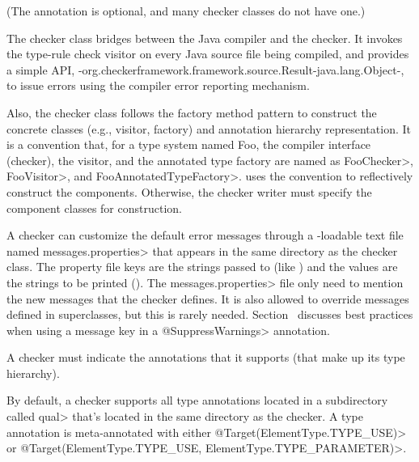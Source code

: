 (The  annotation is
optional, and many checker classes do not have one.)

The checker class bridges between the Java compiler and the checker.  It
invokes the type-rule check visitor on every Java source file being
compiled, and provides a simple API,
{-org.checkerframework.framework.source.Result-java.lang.Object-}, to issue
errors using the compiler error reporting mechanism.

Also, the checker class follows the factory method pattern to
construct the concrete classes (e.g., visitor, factory) and annotation
hierarchy representation.  It is a convention that, for
a type system named Foo, the compiler
interface (checker), the visitor, and the annotated type factory are
named as \<FooChecker>, \<FooVisitor>, and \<FooAnnotatedTypeFactory>.
 uses the convention to
reflectively construct the components.  Otherwise, the checker writer
must specify the component classes for construction.

\begin{sloppypar}
A checker can customize the default error messages through a
-loadable text file named
\<messages.properties> that appears in the same directory as the checker class.
The property file keys are the strings passed to 
(like ) and the values are the strings to be
printed ().
The \<messages.properties> file only need to mention the new messages that
the checker defines.
It is also allowed to override messages defined in superclasses, but this
is rarely needed.
Section~ discusses best practices
when using a message key in a \<@SuppressWarnings> annotation.
\end{sloppypar}


A checker must indicate the annotations that it supports (that make up its type
hierarchy).

By default, a checker supports all type annotations located in a
subdirectory called \<qual> that's located in the same directory as the checker.
A type annotation is meta-annotated with either
\<@Target(ElementType.TYPE\_USE)>
or
\<@Target({ElementType.TYPE\_USE, ElementType.TYPE\_PARAMETER})>.

